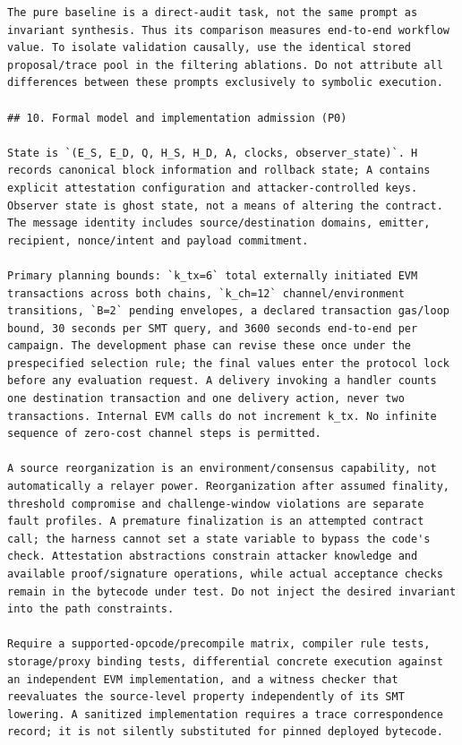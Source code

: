 \documentclass[11pt,a4paper]{article}
\begin{document}
\begin{verbatim}
The pure baseline is a direct-audit task, not the same prompt as invariant synthesis. Thus its comparison measures end-to-end workflow value. To isolate validation causally, use the identical stored proposal/trace pool in the filtering ablations. Do not attribute all differences between these prompts exclusively to symbolic execution.

## 10. Formal model and implementation admission (P0)

State is `(E_S, E_D, Q, H_S, H_D, A, clocks, observer_state)`. H records canonical block information and rollback state; A contains explicit attestation configuration and attacker-controlled keys. Observer state is ghost state, not a means of altering the contract. The message identity includes source/destination domains, emitter, recipient, nonce/intent and payload commitment.

Primary planning bounds: `k_tx=6` total externally initiated EVM transactions across both chains, `k_ch=12` channel/environment transitions, `B=2` pending envelopes, a declared transaction gas/loop bound, 30 seconds per SMT query, and 3600 seconds end-to-end per campaign. The development phase can revise these once under the prespecified selection rule; the final values enter the protocol lock before any evaluation request. A delivery invoking a handler counts one destination transaction and one delivery action, never two transactions. Internal EVM calls do not increment k_tx. No infinite sequence of zero-cost channel steps is permitted.

A source reorganization is an environment/consensus capability, not automatically a relayer power. Reorganization after assumed finality, threshold compromise and challenge-window violations are separate fault profiles. A premature finalization is an attempted contract call; the harness cannot set a state variable to bypass the code's check. Attestation abstractions constrain attacker knowledge and available proof/signature operations, while actual acceptance checks remain in the bytecode under test. Do not inject the desired invariant into the path constraints.

Require a supported-opcode/precompile matrix, compiler rule tests, storage/proxy binding tests, differential concrete execution against an independent EVM implementation, and a witness checker that reevaluates the source-level property independently of its SMT lowering. A sanitized implementation requires a trace correspondence record; it is not silently substituted for pinned deployed bytecode.


\end{verbatim}
\end{document}
